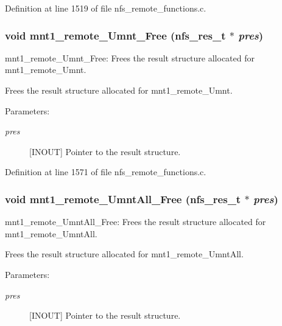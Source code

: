 Definition at line 1519 of file nfs\_\-remote\_\-functions.c.
\subsubsection[{mnt1\_\-remote\_\-Umnt\_\-Free}]{\setlength{\rightskip}{0pt plus 5cm}void mnt1\_\-remote\_\-Umnt\_\-Free (nfs\_\-res\_\-t $\ast$ {\em pres})}\label{group__NFSprocs_gdab285d3b5c4787476d82985d5d1a41e}


mnt1\_\-remote\_\-Umnt\_\-Free: Frees the result structure allocated for mnt1\_\-remote\_\-Umnt.

Frees the result structure allocated for mnt1\_\-remote\_\-Umnt.

\begin{Desc}
\item[Parameters:]
\begin{description}
\item[{\em pres}][INOUT] Pointer to the result structure. \end{description}
\end{Desc}


Definition at line 1571 of file nfs\_\-remote\_\-functions.c.
\subsubsection[{mnt1\_\-remote\_\-UmntAll\_\-Free}]{\setlength{\rightskip}{0pt plus 5cm}void mnt1\_\-remote\_\-UmntAll\_\-Free (nfs\_\-res\_\-t $\ast$ {\em pres})}\label{group__NFSprocs_g0d161d9c8247e1cea6c02ef2fc9def4f}


mnt1\_\-remote\_\-UmntAll\_\-Free: Frees the result structure allocated for mnt1\_\-remote\_\-UmntAll.

Frees the result structure allocated for mnt1\_\-remote\_\-UmntAll.

\begin{Desc}
\item[Parameters:]
\begin{description}
\item[{\em pres}][INOUT] Pointer to the result structure. \end{description}
\end{Desc}


